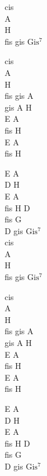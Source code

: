 \begin{chord}
    cis\\
    A\\
    H\\
    fis gis $\mathrm{Gis^7}$

    cis\\
    A\\
    H\\
    fis gis A\\
    gis A H\\
    E A\\
    fis H\\
    E A\\
    fis H

    E A\\
    D H\\
    E A\\
    fis H D\\
    fis G\\
    D gis $\mathrm{Gis^7}$\\
    cis\\
    A\\
    H\\
    fis gis $\mathrm{Gis^7}$

    cis\\
    A\\
    H\\
    fis gis A\\
    gis A H\\
    E A\\
    fis H\\
    E A\\
    fis H

    E A\\
    D H\\
    E A\\
    fis H D\\
    fis G\\
    D gis $\mathrm{Gis^7}$
\end{chord}
